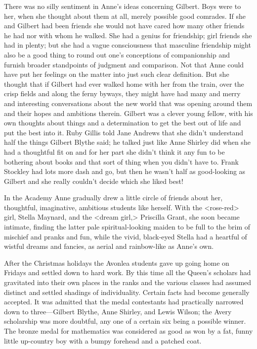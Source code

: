 There was no silly sentiment in Anne's ideas concerning Gilbert. Boys were to her, when she thought about them at all, merely possible good comrades. If she and Gilbert had been friends she would not have cared how many other friends he had nor with whom he walked. She had a genius for friendship; girl friends she had in plenty; but she had a vague consciousness that masculine friendship might also be a good thing to round out one's conceptions of companionship and furnish broader standpoints of judgment and comparison. Not that Anne could have put her feelings on the matter into just such clear definition. But she thought that if Gilbert had ever walked home with her from the train, over the crisp fields and along the ferny byways, they might have had many and merry and interesting conversations about the new world that was opening around them and their hopes and ambitions therein. Gilbert was a clever young fellow, with his own thoughts about things and a determination to get the best out of life and put the best into it. Ruby Gillis told Jane Andrews that she didn't understand half the things Gilbert Blythe said; he talked just like Anne Shirley did when she had a thoughtful fit on and for her part she didn't think it any fun to be bothering about books and that sort of thing when you didn't have to. Frank Stockley had lots more dash and go, but then he wasn't half as good-looking as Gilbert and she really couldn't decide which she liked best!

In the Academy Anne gradually drew a little circle of friends about her, thoughtful, imaginative, ambitious students like herself. With the <rose-red> girl, Stella Maynard, and the <dream girl,> Priscilla Grant, she soon became intimate, finding the latter pale spiritual-looking maiden to be full to the brim of mischief and pranks and fun, while the vivid, black-eyed Stella had a heartful of wistful dreams and fancies, as aerial and rainbow-like as Anne's own.

After the Christmas holidays the Avonlea students gave up going home on Fridays and settled down to hard work. By this time all the Queen's scholars had gravitated into their own places in the ranks and the various classes had assumed distinct and settled shadings of individuality. Certain facts had become generally accepted. It was admitted that the medal contestants had practically narrowed down to three—Gilbert Blythe, Anne Shirley, and Lewis Wilson; the Avery scholarship was more doubtful, any one of a certain six being a possible winner. The bronze medal for mathematics was considered as good as won by a fat, funny little up-country boy with a bumpy forehead and a patched coat.


